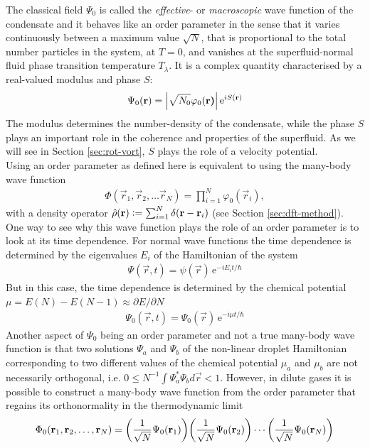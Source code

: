 			The classical field $\Psi_0$ is called the \emph{effective}- or \emph{macroscopic} wave function of the condensate and it behaves like an order parameter in the sense that it varies continuously between a maximum value $\sqrt{N}$, that is proportional to the total number particles in the system, at $T=0$, and vanishes at the superfluid-normal fluid phase transition temperature $T_\lambda$. It is a complex quantity characterised by a real-valued modulus and phase $S$:
			\begin{align}
				\Psi_0(\vec{r}) = \absolutevalue{\sqrt{N_0}\varphi_0(\vec{r)}}\,\mathrm{e}^{iS(\vec{r})}\label{eq:order-param-complex}
			\end{align}
			The modulus determines the number-density of the condensate, while the phase $S$ plays an important role in the coherence and properties of the superfluid. As we will see in Section \ref{sec:rot-vort}, $S$ plays the role of a velocity potential.\\
			
			Using an order parameter as defined here is equivalent to using the many-body wave function
			\begin{align}
				\Phi(\vec{r}_1,\vec{r}_2,\ldots\vec{r}_N)=\prod_{i=1}^{N}\varphi_0(\vec{r}_i),
			\end{align}
			with a density operator $\hat{\rho}(\vec{r}) \vcentcolon= \sum_{i=1}^{N}\delta(\vec{r}-\vec{r}_i)$ (see Section \ref{sec:dft-method}). One way to see why this wave function plays the role of an order parameter is to look at its time dependence. For normal wave functions the time dependence is determined by the eigenvalues $E_i$ of the Hamiltonian of the system
			\begin{align}
				\Psi(\vec{r},t)=\psi(\vec{r})\,\mathrm{e}^{-iE_it/\hbar}
			\end{align}
			But in this case, the time dependence is determined by the chemical potential $\mu=E(N)-E(N-1)\approx \partial E/\partial N$
			\begin{align}
				\Psi_0(\vec{r},t)=\Psi_0(\vec{r})\,\mathrm{e}^{-i\mu t/\hbar} \label{eq:td-order-param}
			\end{align}
			Another aspect of $\Psi_0$ being an order parameter and not a true many-body wave function is that two solutions $\Psi_a$ and $\Psi_b$ of the non-linear droplet Hamiltonian corresponding to two different values of the chemical potential $\mu_a$ and $\mu_b$ are not necessarily orthogonal, i.e. $0 \leq N^{-1}\int\!\Psi_a^*\Psi_b\unit{d}\vec{r} < 1$. However, in dilute gases it is possible to construct a many-body wave function from the order parameter that regains its orthonormality in the thermodynamic limit
			\begin{align}
				\Phi_0(\vec{r}_1,\vec{r}_2,\ldots,\vec{r}_N) = \qty(\frac{1}{\sqrt{N}}\Psi_0(\vec{r}_1))\qty(\frac{1}{\sqrt{N}}\Psi_0(\vec{r}_2))\cdots\qty(\frac{1}{\sqrt{N}}\Psi_0(\vec{r}_N))
			\end{align}
			
